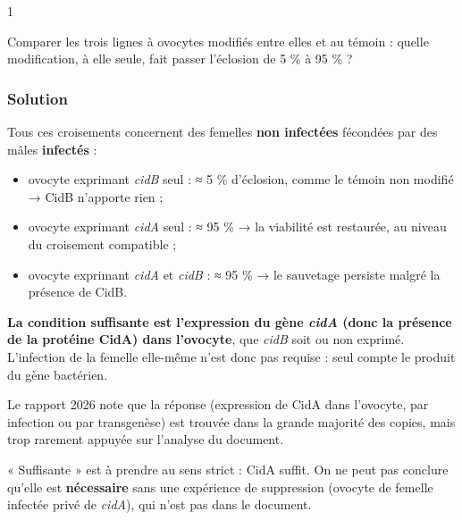 \documentclass[11pt,a4paper]{article}
\providecommand{\tightlist}{\setlength{\itemsep}{0pt}\setlength{\parskip}{0pt}}
\begin{document}
\begin{indication}{1}

Comparer les trois lignes à ovocytes modifiés entre elles et au témoin : quelle modification, à elle seule, fait passer l'éclosion de 5 \% à 95 \% ?

\end{indication}

\hypertarget{solution-53}{%
\subsubsection{Solution}\label{solution-53}}

Tous ces croisements concernent des femelles \textbf{non infectées} fécondées par des mâles \textbf{infectés} :

\begin{itemize}
\tightlist
\item
  ovocyte exprimant \emph{cidB} seul : ≈ 5 \% d'éclosion, comme le témoin non modifié → CidB n'apporte rien ;
\item
  ovocyte exprimant \emph{cidA} seul : ≈ 95 \% → la viabilité est restaurée, au niveau du croisement compatible ;
\item
  ovocyte exprimant \emph{cidA} et \emph{cidB} : ≈ 95 \% → le sauvetage persiste malgré la présence de CidB.
\end{itemize}

\textbf{La condition suffisante est l'expression du gène \emph{cidA} (donc la présence de la protéine CidA) dans l'ovocyte}, que \emph{cidB} soit ou non exprimé. L'infection de la femelle elle-même n'est donc pas requise : seul compte le produit du gène bactérien.

\begin{jury}

Le rapport 2026 note que la réponse (expression de CidA dans l'ovocyte, par infection ou par transgenèse) est trouvée dans la grande majorité des copies, mais trop rarement appuyée sur l'analyse du document.

\end{jury}

\begin{methode}

« Suffisante » est à prendre au sens strict : CidA suffit. On ne peut pas conclure qu'elle est \textbf{nécessaire} sans une expérience de suppression (ovocyte de femelle infectée privé de \emph{cidA}), qui n'est pas dans le document.

\end{methode}
\end{document}
